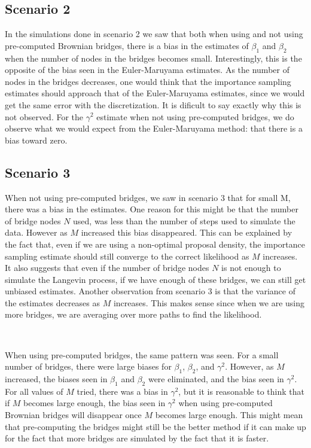 \subsection{Scenario 2}
\label{subsec: scenario 2 interpretation}

In the simulations done in scenario 2 we saw that both when using and not using pre-computed Brownian bridges, there is a bias in the estimates of $\beta_1$ and $\beta_2$ when the number of nodes in the bridges becomes small. Interestingly, this is the opposite of the bias seen in the Euler-Maruyama estimates. As the number of nodes in the bridges decreases, one would think that the importance sampling estimates should approach that of the Euler-Maruyama estimates, since we would get the same error with the discretization. It is dificult to say exactly why this is not observed. For the $\gamma^2$ estimate when not using pre-computed bridges, we do observe what we would expect from the Euler-Maruyama method: that there is a bias toward zero.




\subsection{Scenario 3}
\label{subsec: scenario 3 interpretation}


When not using pre-computed bridges, we saw in scenario 3  that for small M, there was a bias in the estimates. One reason for this might be that the number of bridge nodes $N$ used, was less than the number of steps used to simulate the data. However as $M$ increased this bias disappeared. This can be explained by the fact that, even if we are using a non-optimal proposal density, the importance sampling estimate should still converge to the correct likelihood as $M$ increases. It also suggests that even if the number of bridge nodes $N$ is not enough to simulate the Langevin process, if we have enough of these bridges, we can still get unbiased estimates. Another observation from scenario 3 is that the variance of the estimates decreases as $M$ increases. This makes sense since when we are using more bridges, we are averaging over more paths to find the likelihood.

\

When using pre-computed bridges, the same pattern was seen. For a small number of bridges, there were large biases for $\beta_1$, $\beta_2$, and $\gamma^2$. However, as $M$ increased, the biases seen in $\beta_1$ and $\beta_2$ were eliminated, and the bias seen in $\gamma^2$. For all values of $M$ tried, there was a bias in $\gamma^2$, but it is reasonable to think that if $M$ becomes large enough, the bias seen in $\gamma^2$ when using pre-computed Brownian bridges will disappear once $M$ becomes large enough. This might mean that pre-computing the bridges might still be the better method if it can make up for the fact that more bridges are simulated by the fact that it is faster.


